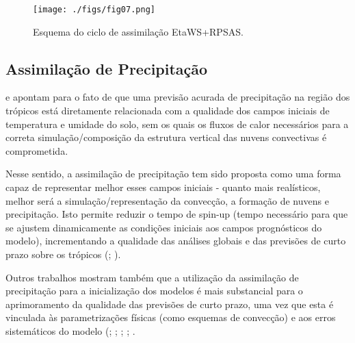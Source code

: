 \begin{figure}
	\centering
		\texttt{[image: ./figs/fig07.png]}
	  \caption{Esquema do ciclo de assimilação EtaWS+RPSAS.}
	 \label{fig07}
\end{figure}

\subsection{Assimilação de Precipitação}

\cite{krishnamurty1991} e \cite{nunesroads2005} apontam para o fato de que uma previsão acurada de precipitação na região dos trópicos está diretamente relacionada com a qualidade dos campos iniciais de temperatura e umidade do solo, sem os quais os fluxos de calor necessários para a correta simulação/composição da estrutura vertical das nuvens convectivas é comprometida.

Nesse sentido, a assimilação de precipitação tem sido proposta como uma forma capaz de representar melhor esses campos iniciais - quanto mais realísticos, melhor será a simulação/representação da convecção, a formação de nuvens e precipitação. Isto permite reduzir o tempo de spin-up (tempo necessário para que se ajustem dinamicamente as condições iniciais aos campos prognósticos do modelo), incrementando a qualidade das análises globais e das previsões de curto prazo sobre os trópicos (\cite{heckley1990}; \cite{falkovich2000}).

Outros trabalhos mostram também que a utilização da assimilação de precipitação para a inicialização dos modelos é mais substancial para o aprimoramento da qualidade das previsões de curto prazo, uma vez que esta é vinculada às parametrizações físicas (como esquemas de convecção) e aos erros sistemáticos do modelo (\cite{kasahara1994}; \cite{mathur1995}; \cite{zupanskimesinger1995}; \cite{nunescocke2004}; \cite{messinger2005}.

